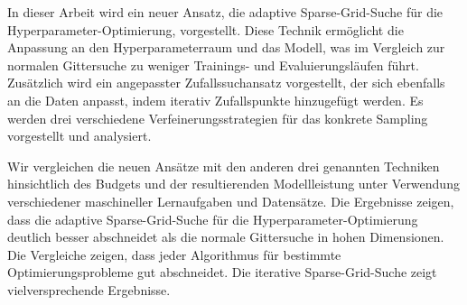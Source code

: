 In dieser Arbeit wird ein neuer Ansatz, die adaptive Sparse-Grid-Suche für die Hyperparameter-Optimierung, vorgestellt. Diese Technik ermöglicht die Anpassung an den Hyperparameterraum und das Modell, was im Vergleich zur normalen Gittersuche zu weniger Trainings- und Evaluierungsläufen führt. Zusätzlich wird ein angepasster Zufallssuchansatz vorgestellt, der sich ebenfalls an die Daten anpasst, indem iterativ Zufallspunkte hinzugefügt werden. Es werden drei verschiedene Verfeinerungsstrategien für das konkrete Sampling vorgestellt und analysiert.

Wir vergleichen die neuen Ansätze mit den anderen drei genannten Techniken hinsichtlich des Budgets und der resultierenden Modellleistung unter Verwendung verschiedener maschineller Lernaufgaben und Datensätze. Die Ergebnisse zeigen, dass die adaptive Sparse-Grid-Suche für die Hyperparameter-Optimierung deutlich besser abschneidet als die normale Gittersuche in hohen Dimensionen. Die Vergleiche zeigen, dass jeder Algorithmus für bestimmte Optimierungsprobleme gut abschneidet. Die iterative Sparse-Grid-Suche zeigt vielversprechende Ergebnisse.
